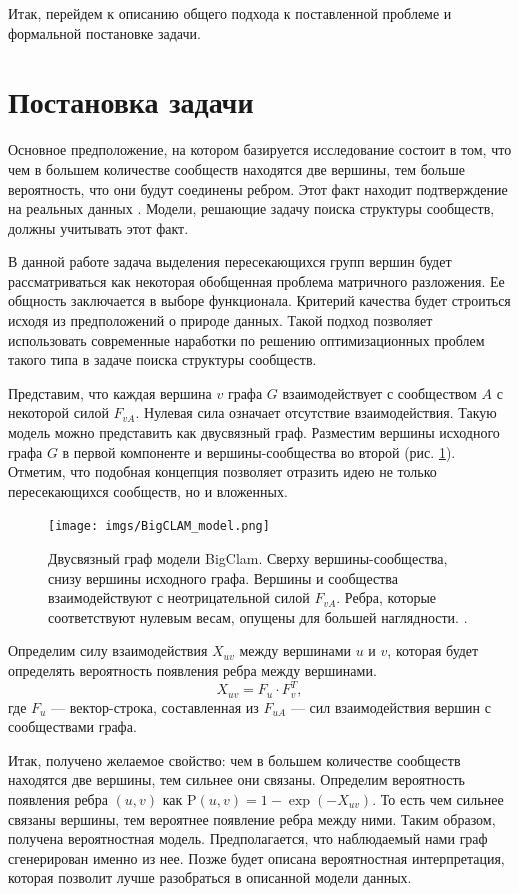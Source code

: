 \documentclass{ITaSconf}
\def\PP{\mathrm{P}}
\begin{document}
	Итак, перейдем к описанию общего подхода к поставленной проблеме и формальной постановке задачи.
	
	\section{Постановка задачи}
	
	Основное предположение, на котором базируется исследование состоит в том, что чем в большем количестве сообществ находятся две вершины, тем больше вероятность, что они будут соединены ребром.
	Этот факт находит подтверждение на реальных данных \cite{yang2013overlapping}.
	Модели, решающие задачу поиска структуры сообществ, должны учитывать этот факт.
	
	В данной работе задача выделения пересекающихся групп вершин будет рассматриваться как некоторая обобщенная проблема матричного разложения.
	Ее общность заключается в выборе функционала.
	Критерий качества будет строиться исходя из предположений о природе данных.
	Такой подход позволяет использовать современные наработки по решению оптимизационных проблем такого типа в задаче поиска структуры сообществ.
	
	Представим, что каждая вершина $v$ графа $G$ взаимодействует с сообществом $A$ с некоторой силой $F_{vA}$.
	Нулевая сила означает отсутствие взаимодействия.
	Такую модель можно представить как двусвязный граф.
	Разместим вершины исходного графа $G$ в первой компоненте и вершины-сообщества во второй (рис.
\ref{fig:AGM}).
	Отметим, что подобная концепция позволяет отразить идею не только пересекающихся сообществ, но и вложенных.
	\begin{figure}[!ht]
		\centering
		\texttt{[image: imgs/BigCLAM\_model.png]}
		\caption{Двусвязный граф модели BigClam.
				 Сверху вершины-сообщества, снизу вершины исходного графа.
				 Вершины и сообщества взаимодействуют с неотрицательной силой $F_{vA}$.
				 Ребра, которые соответствуют нулевым весам, опущены для большей наглядности.
\cite{yang2013overlapping}.}
		\label{fig:AGM}
	\end{figure}
	Определим силу взаимодействия $X_{uv}$ между вершинами $u$ и $v$, которая будет определять вероятность появления ребра между вершинами.
	$$X_{uv} = F_{u} \cdot F_{v}^T,$$
	где $F_{u}$ --- вектор-строка, составленная из $F_{uA}$ --- сил взаимодействия вершин с сообществами графа.
	
	Итак, получено желаемое свойство: чем в большем количестве сообществ находятся две вершины, тем сильнее они связаны.
	Определим вероятность появления ребра $(u,v)$ как $\PP(u, v) = 1 - \exp ( - X_{uv})$.
	То есть чем сильнее связаны вершины, тем вероятнее появление ребра между ними.
	Таким образом, получена вероятностная модель.
	Предполагается, что наблюдаемый нами граф сгенерирован именно из нее.
	Позже будет описана вероятностная интерпретация, которая позволит лучше разобраться в описанной модели данных.
	
\end{document}
